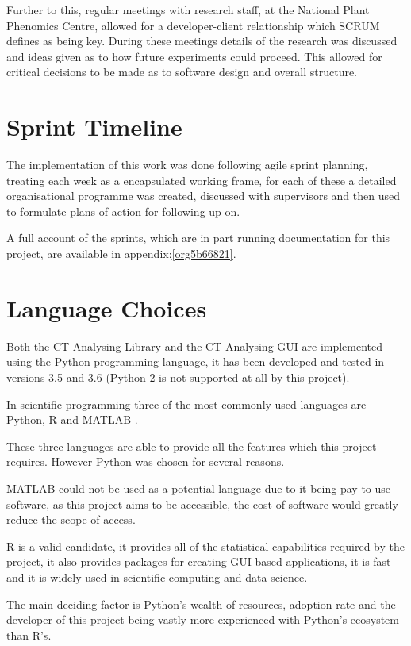 \documentclass[11pt]{report}
\begin{document}
Further to this, regular meetings with research staff, at the National Plant Phenomics Centre,  allowed for a developer-client relationship which SCRUM defines as being key. During these meetings details of the research was discussed and ideas given as to how future experiments could proceed. This allowed for critical decisions to be made as to software design and overall structure.
\section{Sprint Timeline}
\label{sec:org27e48cb}
The implementation of this work was done following agile sprint planning, treating each week as a encapsulated working frame, for each of these a detailed organisational programme was created, discussed with supervisors and then used to formulate plans of action for following up on.

A full account of the sprints, which are in part running documentation for this project, are available in appendix:\ref{org5b66821}.

\section{Language Choices}
\label{sec:org23cf716}
Both the CT Analysing Library and the CT Analysing GUI are implemented using the Python programming language, it has been developed and tested in versions 3.5 and 3.6 (Python 2 is not supported at all by this project).

In scientific programming three of the most commonly used languages are Python, R and MATLAB \cite{Ozgur2016}.

These three languages are able to provide all the features which this project requires. However Python was chosen for several reasons.

MATLAB could not be used as a potential language due to it being pay to use software, as this project aims to be accessible, the cost of software would greatly reduce the scope of access.

R is a valid candidate, it provides all of the statistical capabilities required by the project, it also provides packages for creating GUI based applications, it is fast and it is widely used in scientific computing and data science.

The main deciding factor is Python's wealth of resources, adoption rate and the developer of this project being vastly more experienced with Python's ecosystem than R's.
\end{document}
